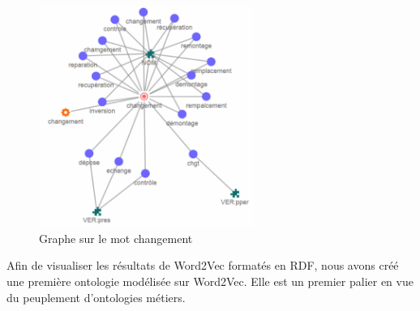 \begin{figure}[tb]
    \begin{center}
        \includegraphics[width=7cm]{figures/w2v}
    \end{center}
    \caption{Graphe sur le mot changement}\label{fig:w2v}
\end{figure}
%
Afin de visualiser les résultats de Word2Vec formatés en RDF, nous avons créé une première ontologie modélisée sur Word2Vec. Elle est un premier palier en vue du peuplement d'ontologies métiers.

